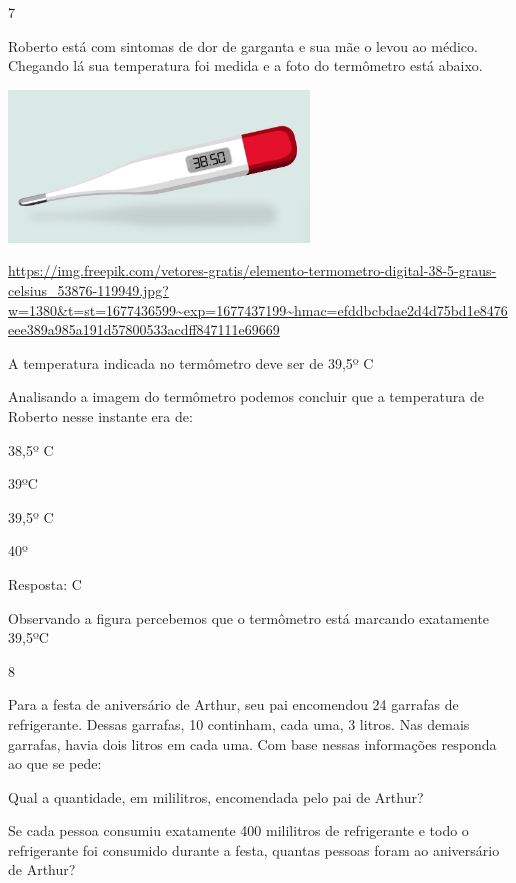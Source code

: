 \num{7}

Roberto está com sintomas de dor de garganta e sua mãe o levou ao
médico. Chegando lá sua temperatura foi medida e a foto do termômetro
está abaixo.

\includegraphics[width=3.15000in,height=1.59426in]{media/image47.png}

\url{https://img.freepik.com/vetores-gratis/elemento-termometro-digital-38-5-graus-celsius_53876-119949.jpg?w=1380\&t=st=1677436599~exp=1677437199~hmac=efddbcbdae2d4d75bd1e8476eee389a985a191d57800533acdff847111e69669}

A temperatura indicada no termômetro deve ser de 39,5º C

Analisando a imagem do termômetro podemos concluir que a temperatura de
Roberto nesse instante era de:

\begin{escolha}

\item
  38,5º C
\item
  39ºC
\item
  39,5º C
\item
  40º
\end{escolha}

Resposta: C

Observando a figura percebemos que o termômetro está marcando exatamente
39,5ºC

\num{8}

Para a festa de aniversário de Arthur, seu pai encomendou 24 garrafas de
refrigerante. Dessas garrafas, 10 continham, cada uma, 3 litros. Nas
demais garrafas, havia dois litros em cada uma. Com base nessas
informações responda ao que se pede:

\begin{escolha}

\item
  Qual a quantidade, em mililitros, encomendada pelo pai de Arthur?

\item
  Se cada pessoa consumiu exatamente 400 mililitros de refrigerante e
  todo o refrigerante foi consumido durante a festa, quantas pessoas
  foram ao aniversário de Arthur?

\end{escolha}


